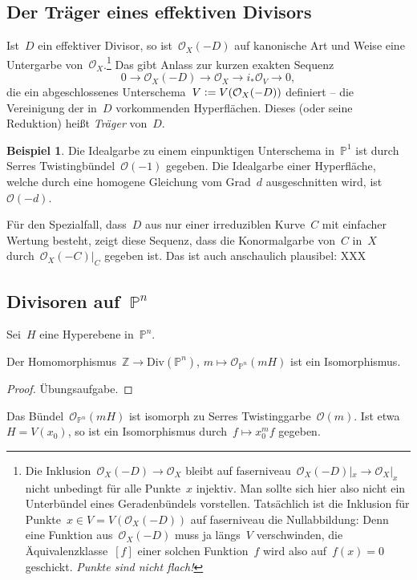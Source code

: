 \documentclass[a4paper,ngerman,12pt]{scrartcl}
\theoremstyle{definition}
\newtheorem{ex}[defn]{Beispiel}
\theoremstyle{plain}
\theoremstyle{remark}
\newcommand{\ZZ}{\mathbb{Z}}
\newcommand{\PP}{\mathbb{P}}
\renewcommand{\O}{\mathcal{O}}
\newcommand{\lra}{\longrightarrow}
\newcommand{\Div}{\mathrm{Div}}
\newcommand{\defeq}{\vcentcolon=}
\begin{document}
\subsection*{Der Träger eines effektiven Divisors}

Ist~$D$ ein effektiver Divisor, so ist~$\O_X(-D)$ auf kanonische Art
und Weise eine Untergarbe von~$\O_X$.\footnote{Die Inklusion~$\O_X(-D) \to
\O_X$ bleibt auf faserniveau~$\O_X(-D)|_x \to \O_X|_x$ nicht unbedingt für alle
Punkte~$x$ injektiv. Man sollte sich hier also nicht ein Unterbündel eines 
Geradenbündels vorstellen. Tatsächlich ist die Inklusion für Punkte~$x \in V = V(\O_X(-D))$
auf faserniveau die Nullabbildung: Denn eine Funktion aus~$\O_X(-D)$ muss ja längs~$V$
verschwinden, die Äquivalenzklasse~$[f]$ einer solchen Funktion~$f$ wird also
auf~$f(x) = 0$ geschickt. \emph{Punkte sind nicht flach!}}
Das gibt Anlass zur kurzen exakten Sequenz
\[ 0 \lra \O_X(-D) \lra \O_X \lra i_*\O_V \lra 0, \]
die ein abgeschlossenes Unterschema~$V \defeq V(\O_X(-D))$ definiert -- die Vereinigung
der in~$D$ vorkommenden Hyperflächen. Dieses (oder seine Reduktion) heißt
\emph{Träger} von~$D$.

\begin{ex}Die Idealgarbe zu einem einpunktigen Unterschema in~$\PP^1$ ist durch
Serres Twistingbündel~$\O(-1)$ gegeben. Die Idealgarbe einer Hyperfläche,
welche durch eine homogene Gleichung vom Grad~$d$ ausgeschnitten wird,
ist~$\O(-d)$.
\end{ex}

Für den Spezialfall, dass~$D$ aus nur einer irreduziblen Kurve~$C$ mit
einfacher Wertung besteht, zeigt diese Sequenz, dass die Konormalgarbe von~$C$
in~$X$ durch~$\O_X(-C)|_C$ gegeben ist. Das ist auch anschaulich plausibel: XXX


\subsection*{Divisoren auf~$\PP^n$}

Sei~$H$ eine Hyperebene in~$\PP^n$.

\begin{prop}Der Homomorphismus~$\ZZ \to \Div(\PP^n)$, $m \mapsto \O_{\PP^n}(mH)$ ist
ein Isomorphismus.\end{prop}
\begin{proof}Übungsaufgabe.\end{proof}

Das Bündel~$\O_{\PP^n}(mH)$ ist isomorph zu Serres Twistinggarbe~$\O(m)$. Ist etwa~$H =
V(x_0)$, so ist ein Isomorphismus durch~$f \mapsto x_0^m f$ gegeben.
\end{document}
